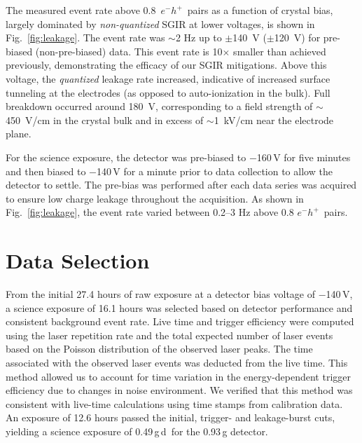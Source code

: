 \documentclass[%
reprint,
superscriptaddress,
preprintnumbers,
amsmath,amssymb,
prl,
aps,
floatfix
]{revtex4-1}
\newcommand{\eh}{$e^-h^+$}
\newcommand{\gd}{g\,d}
\begin{document}
The measured event rate above 0.8~\eh~pairs as a function of crystal bias, largely dominated by {\em non-quantized} SGIR at lower voltages, is shown in Fig.~\ref{fig:leakage}. The event rate was $\sim$2 Hz up to $\pm$140~V ($\pm$120~V) for pre-biased (non-pre-biased) data. This event rate is 10$\times$ smaller than achieved previously, demonstrating the efficacy of our SGIR mitigations. 
Above this voltage, the {\em quantized} leakage rate increased, indicative of increased surface tunneling at the electrodes (as opposed to auto-ionization in the bulk). Full breakdown occurred around 180~V, corresponding to a field strength of $\sim$450~V/cm in the crystal bulk and in excess of $\sim$1~kV/cm near the electrode plane.

For the science exposure, the detector was pre-biased to $-$160\,V for five minutes and then biased to $-$140\,V for a minute prior to data collection to allow the detector to settle. The pre-bias was performed after each data series was acquired to ensure low charge leakage throughout the acquisition. 
As shown in Fig.~\ref{fig:leakage}, the event rate varied between 0.2--3 Hz above 0.8 \eh\ pairs. 

\section{Data Selection}

From the initial 27.4 hours of raw exposure at a detector bias voltage of $-$140\,V, a science exposure of 16.1 hours was selected based on detector performance and consistent background event rate. 
Live time and trigger efficiency were computed using the laser repetition rate and the total expected number of laser events based on the Poisson distribution of the observed laser peaks. The time associated with the observed laser events was deducted from the live time. This method allowed us to account for time variation in the energy-dependent trigger efficiency due to changes in noise environment. We verified that this method was consistent with live-time calculations using time stamps from calibration data. An exposure of 12.6 hours passed the initial, trigger- and leakage-burst cuts, yielding a science exposure of 0.49\,\gd\ for the 0.93\,g detector. 
\end{document}
